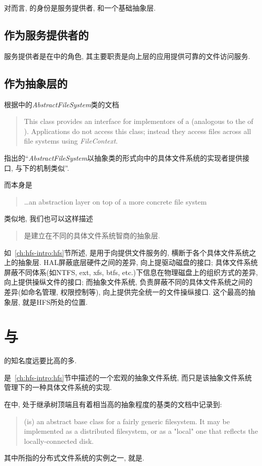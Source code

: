 对\Hadoop 而言, \HFS 的身份是服务提供者, 和一个基础抽象层.

\subsection{作为服务提供者的\HFS}

服务提供者是\HFS 在\Hadoop 中的角色,
其主要职责是向上层的\Hadoop 应用提供可靠的文件访问服务.

\subsection{作为抽象层的\HFS}

根据\HadoopFS 中的\emph{AbstractFileSystem}类的文档
\begin{quote}
This class provides an interface for implementors of a \HadoopFS
(analogous to the \VFS\space of \Unix). Applications do not access this class;
instead they access files across all file systems using \emph{FileContext}.
\end{quote}
指出的``\emph{AbstractFileSystem}以抽象类的形式向\HFS 中的具体文件系统的实现者提供接口,
与\Unix 下\VFS 的机制类似''.

而\VFS 本身是
\begin{quote}
    \ldots an abstraction layer on top of a more concrete file system
\end{quote}

类似地, 我们也可以这样描述\HFS
\begin{quote}
    \HFS 是建立在不同的具体文件系统智商的抽象层.
\end{quote}

\blankfigure{}

如~\ref{ch:hfs-intro:hfs}节所述, \HFS 是用于向\Hadoop 提供文件服务的,
横断于各个具体文件系统之上的抽象层.
HAL屏蔽底层硬件之间的差异, 向上提驱动磁盘的接口;
具体文件系统屏蔽不同体系(如NTFS, ext, xfs, btfs, etc.)下信息在物理磁盘上的组织方式的差异,
向上提供操纵文件的接口;
而抽象文件系统, 负责屏蔽不同的具体文件系统之间的差异(如命名管理, 权限控制等),
向上提供完全统一的文件操纵接口. 这个最高的抽象层, 就是HFS所处的位置.

\section{\HFS 与\HDFS}

\HDFS 的知名度远要比\HFS 高的多.

\HadoopFS 是~\ref{ch:hfs-intro:hfs}节中描述的一个宏观的抽象文件系统,
而\HadoopDFS 只是该抽象文件系统管理下的一种具体文件系统的实现.

在\HFS 中, 处于继承树顶端且有着相当高的抽象程度的基类\FS 的文档中记录到:

\begin{quote}
(\FS\space is) an abstract base class for a fairly generic filesystem. It
may be implemented as a distributed filesystem, or as a "local"
one that reflects the locally-connected disk.
\end{quote}

其中所指的分布式文件系统的实例之一, 就是\HDFS.

